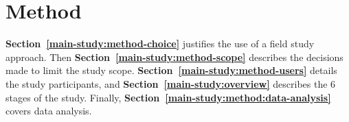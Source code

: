 

\newpage
\section{Method}
\label{main-study:method}


\textbf{Section~\ref{main-study:method-choice}} justifies the use of a field study approach. Then \textbf{Section~\ref{main-study:method-scope}} describes the decisions made to limit the study scope. \textbf{Section~\ref{main-study:method-users}} details the study participants, and \textbf{Section~\ref{main-study:overview}} describes the 6 stages of the study.  Finally, \textbf{Section~\ref{main-study:method:data-analysis}} covers data analysis.

